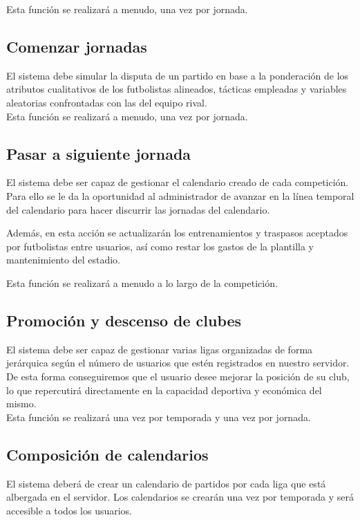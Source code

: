 Esta función se realizará a menudo, una vez por jornada.

\subsection{Comenzar jornadas}
El sistema debe simular la disputa de un partido en base a la ponderación de los
atributos cualitativos de los futbolistas alineados, tácticas empleadas y
variables aleatorias confrontadas con las del equipo
rival.\\

Esta función se realizará a menudo, una vez por jornada.

\subsection{Pasar a siguiente jornada}
El sistema debe ser capaz de gestionar el calendario creado de cada
competición. Para ello se le da la oportunidad al administrador de avanzar en la
línea temporal del calendario para hacer discurrir las jornadas del calendario.

Además, en esta acción se actualizarán los entrenamientos y traspasos aceptados
por futbolistas entre usuarios, así como restar los gastos de la plantilla y
mantenimiento del estadio.

Esta función se realizará a menudo a lo largo de la competición.

\subsection{Promoción y descenso de clubes}
El sistema debe ser capaz de gestionar varias ligas organizadas de forma
jerárquica según el número de usuarios que estén registrados en nuestro
servidor. De esta forma conseguiremos que el usuario desee mejorar la posición
de su club, lo que repercutirá directamente en la
capacidad deportiva y económica del mismo.\\

Esta función se realizará una vez por temporada y una vez por jornada.

\subsection{Composición de calendarios}
El sistema deberá de crear un calendario de partidos por cada liga que está
albergada en el servidor. Los calendarios se crearán una vez por
temporada y será accesible a todos los usuarios.\\

